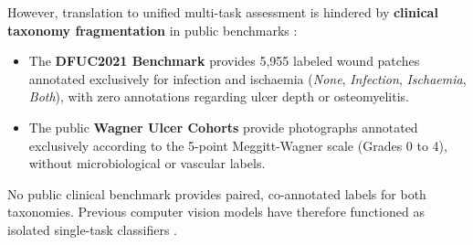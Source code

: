 \documentclass[journal]{IEEEtran}
\begin{document}
However, translation to unified multi-task assessment is hindered by \textbf{clinical taxonomy fragmentation} in public benchmarks \cite{yap2022development}:
\begin{itemize}
    \item The \textbf{DFUC2021 Benchmark} \cite{cassidy2021diabetic} provides 5,955 labeled wound patches annotated exclusively for infection and ischaemia (\textit{None}, \textit{Infection}, \textit{Ischaemia}, \textit{Both}), with zero annotations regarding ulcer depth or osteomyelitis.
    \item The public \textbf{Wagner Ulcer Cohorts} \cite{rostami2024deep, zhou2025deep} provide photographs annotated exclusively according to the 5-point Meggitt-Wagner scale (Grades 0 to 4), without microbiological or vascular labels.
\end{itemize}

No public clinical benchmark provides paired, co-annotated labels for both taxonomies. Previous computer vision models have therefore functioned as isolated single-task classifiers \cite{toofanee2023dfu, galdran2021convolutional, rostami2024deep, zhou2025deep}.
\end{document}
